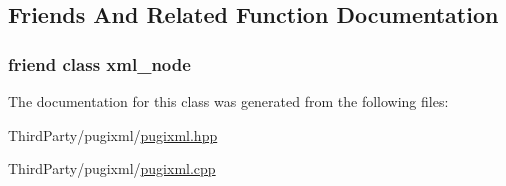 \subsection{Friends And Related Function Documentation}
\hypertarget{classpugi_1_1xml__text_a156d917a92815c7b593bd5ef19f6d5fb}{
\subsubsection[{xml\-\_\-node}]{\setlength{\rightskip}{0pt plus 5cm}friend class {\bf xml\-\_\-node}\hspace{0.3cm}{\ttfamily [friend]}}}\label{classpugi_1_1xml__text_a156d917a92815c7b593bd5ef19f6d5fb}


The documentation for this class was generated from the following files\-:\begin{DoxyCompactItemize}
\item 
Third\-Party/pugixml/\hyperlink{pugixml_8hpp}{pugixml.\-hpp}\item 
Third\-Party/pugixml/\hyperlink{pugixml_8cpp}{pugixml.\-cpp}\end{DoxyCompactItemize}
